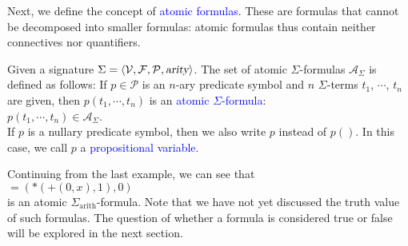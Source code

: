 Next, we define the concept of \textcolor{blue}{atomic formulas}. These are formulas that cannot be decomposed into smaller formulas: atomic formulas thus contain neither connectives nor quantifiers.
\begin{Definition}
  Given a signature $\Sigma = \langle \mathcal{V}, \mathcal{F}, \mathcal{P}, \textsl{arity} \rangle$. 
  The set of atomic $\Sigma$-formulas $\mathcal{A}_\Sigma$ 
  is defined as follows: If $p \in \mathcal{P}$ is an $n$-ary predicate symbol
  and $n$ $\Sigma$-terms $t_1$, $\cdots$, $t_n$ are given, then
  $p(t_1,\cdots,t_n)$ is an \textcolor{blue}{atomic $\Sigma$-formula}: \\[0.2cm]
  \hspace*{1.3cm} $p(t_1,\cdots,t_n) \in \mathcal{A}_\Sigma$.  \\[0.2cm]
  If $p$ is a nullary predicate symbol, then we also write $p$ instead of $p()$.
  In this case, we call $p$ a \textcolor{blue}{propositional variable}.
  \eox
\end{Definition}

\exampleEng
Continuing from the last example, we can see that \\[0.2cm]
\hspace*{1.3cm} $\mathtt{=}(*(\mathtt{+}(0,x),1),0)$ \\[0.2cm]
is an atomic $\Sigma_\mathrm{arith}$-formula. Note that we have not yet discussed the truth value of such
formulas. The question of whether a formula is considered true or false
will be explored in the next section.
\eox


